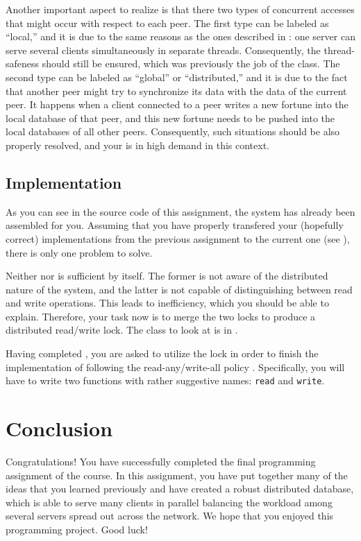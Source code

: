 \documentclass[a4paper]{article}
\begin{document}
Another important aspect to realize is that there two types of concurrent
accesses that might occur with respect to each peer. The first type can be
labeled as ``local,'' and it is due to the same reasons as the ones described in
: one server can serve several clients simultaneously in separate
threads. Consequently, the thread-safeness should still be ensured, which was
previously the job of the  class. The second type can
be labeled as ``global'' or ``distributed,'' and it is due to the fact that
another peer might try to synchronize its data with the data of the current
peer. It happens when a client connected to a peer writes a new fortune into the
local database of that peer, and this new fortune needs to be pushed into the
local databases of all other peers. Consequently, such situations should be also
properly resolved, and your  is in high demand in
this context.

\subsection{Implementation} 
As you can see in the source code of this assignment, the system has already
been assembled for you. Assuming that you have properly transfered your
(hopefully correct) implementations from the previous assignment to the current
one (see ), there is only one problem to solve.

Neither  nor  is sufficient
by itself. The former is not aware of the distributed nature of the system, and
the latter is not capable of distinguishing between read and write operations.
This leads to inefficiency, which you should be able to explain. Therefore, your
task now is to merge the two locks to produce a distributed read/write lock. The
class to look at is  in
.

Having completed , you are asked to utilize
the lock in order to finish the implementation of 
following the read-any/write-all policy \cite{lecture8}. Specifically, you will
have to write two functions with rather suggestive names: \texttt{read} and
\texttt{write}.

\section{Conclusion}
Congratulations! You have successfully completed the final programming
assignment of the course. In this assignment, you have put together many of the
ideas that you learned previously and have created a robust distributed
database, which is able to serve many clients in parallel balancing the workload
among several servers spread out across the network. We hope that you enjoyed
this programming project. Good luck!

\printbibliography
\end{document}
